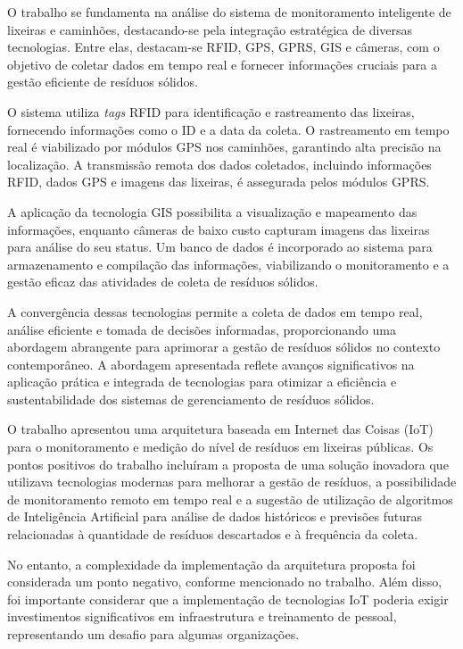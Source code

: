 \documentclass[12pt]{article}
\begin{document}
\cite{HANNAN20112406} O trabalho se fundamenta na análise do sistema de monitoramento inteligente de lixeiras e caminhões, destacando-se pela integração estratégica de diversas tecnologias. Entre elas, destacam-se RFID, GPS, GPRS, GIS e câmeras, com o objetivo de coletar dados em tempo real e fornecer informações cruciais para a gestão eficiente de resíduos sólidos.

O sistema utiliza \textit{tags} RFID para identificação e rastreamento das lixeiras, fornecendo informações como o ID e a data da coleta. O rastreamento em tempo real é viabilizado por módulos GPS nos caminhões, garantindo alta precisão na localização. A transmissão remota dos dados coletados, incluindo informações RFID, dados GPS e imagens das lixeiras, é assegurada pelos módulos GPRS.

A aplicação da tecnologia GIS possibilita a visualização e mapeamento das informações, enquanto câmeras de baixo custo capturam imagens das lixeiras para análise do seu status. Um banco de dados é incorporado ao sistema para armazenamento e compilação das informações, viabilizando o monitoramento e a gestão eficaz das atividades de coleta de resíduos sólidos.

A convergência dessas tecnologias permite a coleta de dados em tempo real, análise eficiente e tomada de decisões informadas, proporcionando uma abordagem abrangente para aprimorar a gestão de resíduos sólidos no contexto contemporâneo. A abordagem apresentada reflete avanços significativos na aplicação prática e integrada de tecnologias para otimizar a eficiência e sustentabilidade dos sistemas de gerenciamento de resíduos sólidos.

\cite{de2018arquitetura} O trabalho apresentou uma arquitetura baseada em Internet das Coisas (IoT) para o monitoramento e medição do nível de resíduos em lixeiras públicas. Os pontos positivos do trabalho incluíram a proposta de uma solução inovadora que utilizava tecnologias modernas para melhorar a gestão de resíduos, a possibilidade de monitoramento remoto em tempo real e a sugestão de utilização de algoritmos de Inteligência Artificial para análise de dados históricos e previsões futuras relacionadas à quantidade de resíduos descartados e à frequência da coleta.

No entanto, a complexidade da implementação da arquitetura proposta foi considerada um ponto negativo, conforme mencionado no trabalho. Além disso, foi importante considerar que a implementação de tecnologias IoT poderia exigir investimentos significativos em infraestrutura e treinamento de pessoal, representando um desafio para algumas organizações.
\end{document}
